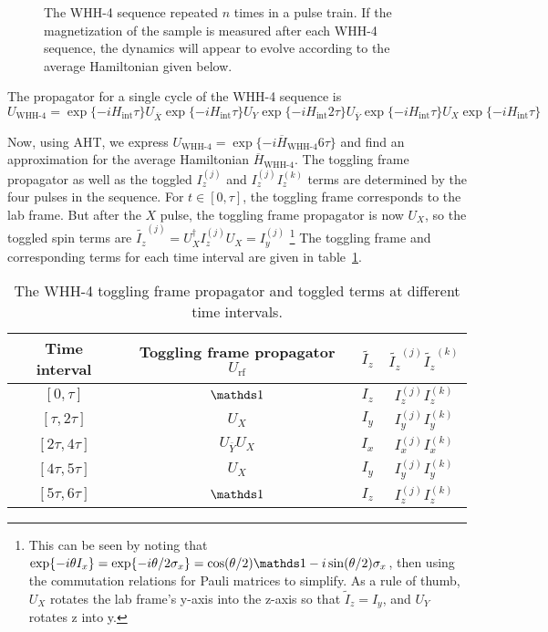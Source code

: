 \begin{figure}[H]
    \centering
    
    \caption{The WHH-4 sequence repeated $n$ times in a pulse train. If the magnetization of the sample is measured after each WHH-4 sequence, the dynamics will appear to evolve according to the average Hamiltonian given below.}
    \label{fig:WHH-4}
\end{figure}

The propagator for a single cycle of the WHH-4 sequence is
\[
U_{\text{WHH-4}} =
    \exp\{-i H_{\text{int}} \tau\} U_{\overline{X}}
    \exp\{-i H_{\text{int}} \tau\} U_Y
    \exp\{-i H_{\text{int}} 2\tau\} U_{\overline{Y}}
    \exp\{-i H_{\text{int}} \tau\} U_X
    \exp\{-i H_{\text{int}} \tau\}
\]

Now, using AHT, we express $U_{\text{WHH-4}} = \exp\{-i \overline{H}_{\text{WHH-4}} 6\tau\}$ and find an approximation for the average Hamiltonian $\overline{H}_{\text{WHH-4}}$. The toggling frame propagator as well as the toggled $I_z^{(j)}$ and $I_z^{(j)}I_z^{(k)}$ terms are determined by the four pulses in the sequence. For $t \in [0, \tau]$, the toggling frame corresponds to the lab frame.
But after the $X$ pulse, the toggling frame propagator is now $U_X$, so the toggled spin terms are $\widetilde{I_z}^{(j)} = U_X^\dagger I_z^{(j)} U_X = I_y^{(j)}$
\footnote{
This can be seen by noting that $\exp\{-i \theta I_x\} = \exp\{-i \theta/2 \sigma_x\} = \cos(\theta/2) \identity - i\sin(\theta/2) \sigma_x$, then using the commutation relations for Pauli matrices to simplify. As a rule of thumb, $U_X$ rotates the lab frame's y-axis into the z-axis so that $\widetilde{I}_z = I_y$, and $U_Y$ rotates z into y.
}
The toggling frame and corresponding terms for each time interval are given in table~\ref{tab:WHH-4}.

\begin{table}[H]
    \centering
    \caption{The WHH-4 toggling frame propagator and toggled terms at different time intervals.}
    \label{tab:WHH-4}
    \begin{tabular}{c c c c}
        Time interval & Toggling frame propagator $U_{\text{rf}}$ & $\widetilde{I_z}$ & $\widetilde{I_z}^{(j)}\widetilde{I_z}^{(k)}$ \\
        \hline
        $[0, \tau]$ & $\identity$ & $I_z$ & $I_z^{(j)}I_z^{(k)}$ \\
        $[\tau, 2\tau]$ & $U_X$ & $I_y$ & $I_y^{(j)}I_y^{(k)}$ \\
        $[2\tau, 4\tau]$ & $U_{\overline{Y}} U_X$ & $I_x$ & $I_x^{(j)}I_x^{(k)}$ \\
        $[4\tau, 5\tau]$ & $U_X$ & $I_y$ & $I_y^{(j)}I_y^{(k)}$ \\
        $[5\tau, 6\tau]$ & $\identity$ & $I_z$ & $I_z^{(j)}I_z^{(k)}$ \\
    \end{tabular}
\end{table}

